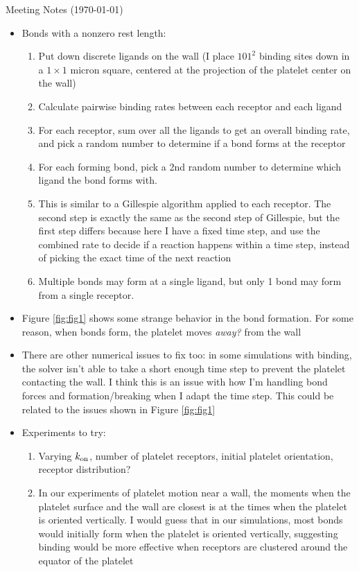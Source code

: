 \documentclass{article}
\newcommand{\tn}{\textnormal}
\begin{document}
\pagestyle{plain}

\begin{center}
  {\Large Meeting Notes (\today)}
\end{center}

\begin{itemize}
\item Bonds with a nonzero rest length:
  \begin{enumerate}
  \item Put down discrete ligands on the wall (I place $101^2$ binding
    sites down in a $1 \times 1$ micron square, centered at the
    projection of the platelet center on the wall)
  \item Calculate pairwise binding rates between each receptor and
    each ligand
  \item For each receptor, sum over all the ligands to get an overall
    binding rate, and pick a random number to determine if a bond
    forms at the receptor
  \item For each forming bond, pick a 2nd random number to determine
    which ligand the bond forms with. 
  \item This is similar to a Gillespie algorithm applied to each
    receptor. The second step is exactly the same as the second step
    of Gillespie, but the first step differs because here I have a
    fixed time step, and use the combined rate to decide if a reaction
    happens within a time step, instead of picking the exact time of
    the next reaction
  \item Multiple bonds may form at a single ligand, but only 1 bond
    may form from a single receptor.
  \end{enumerate}
\item Figure \ref{fig:fig1} shows some strange behavior in the bond formation. For
  some reason, when bonds form, the platelet moves \emph{away?} from
  the wall
\item There are other numerical issues to fix too: in some simulations
  with binding, the solver isn't able to take a short enough time step
  to prevent the platelet contacting the wall. I think this is an
  issue with how I'm handling bond forces and formation/breaking when
  I adapt the time step. This could be related to the issues shown in
  Figure \ref{fig:fig1}
\item Experiments to try:
  \begin{enumerate}
  \item Varying $k_\tn{on}$, number of platelet receptors, initial
    platelet orientation, receptor distribution?
  \item In our experiments of platelet motion near a wall, the moments
    when the platelet surface and the wall are closest is at the times
    when the platelet is oriented vertically. I would guess that in
    our simulations, most bonds would initially form when the platelet
    is oriented vertically, suggesting binding would be more effective
    when receptors are clustered around the equator of the platelet
  \end{enumerate}
\end{itemize}
\end{document}
